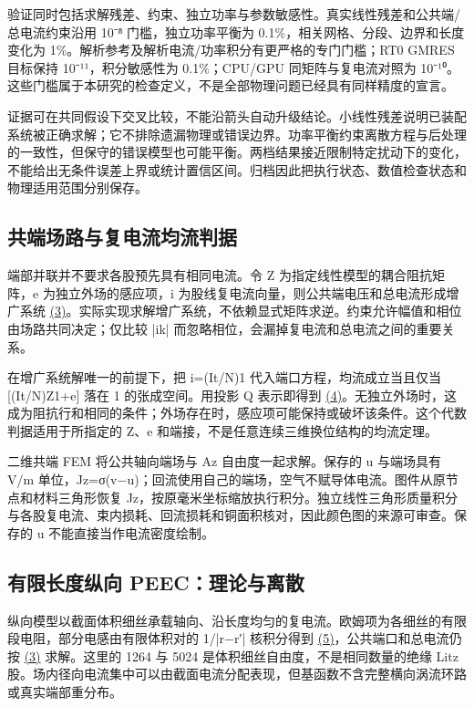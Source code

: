 \documentclass[11pt]{article}
\begin{document}
验证同时包括求解残差、约束、独立功率与参数敏感性。真实线性残差和公共端/总电流约束沿用 10⁻⁸ 门槛，独立功率平衡为 0.1\%，相关网格、分段、边界和长度变化为 1\%。解析参考及解析电流/功率积分有更严格的专门门槛；RT0 GMRES 目标保持 10⁻¹¹，积分敏感性为 0.1\%；CPU/GPU 同矩阵与复电流对照为 10⁻¹⁰。这些门槛属于本研究的检查定义，不是全部物理问题已经具有同样精度的宣言。


证据可在共同假设下交叉比较，不能沿箭头自动升级结论。小线性残差说明已装配系统被正确求解；它不排除遗漏物理或错误边界。功率平衡约束离散方程与后处理的一致性，但保守的错误模型也可能平衡。两档结果接近限制特定扰动下的变化，不能给出无条件误差上界或统计置信区间。归档因此把执行状态、数值检查状态和物理适用范围分别保存。


\subsection*{共端场路与复电流均流判据}
\hypertarget{02.common.heading}{}
端部并联并不要求各股预先具有相同电流。令 Z 为指定线性模型的耦合阻抗矩阵，e 为独立外场的感应项，i 为股线复电流向量，则公共端电压和总电流形成增广系统 \href{paper_zh-CN_single.pdf#E04}{(3)}。实际实现求解增广系统，不依赖显式矩阵求逆。约束允许幅值和相位由场路共同决定；仅比较 |ik| 而忽略相位，会漏掉复电流和总电流之间的重要关系。


在增广系统解唯一的前提下，把 i=(It/N)1 代入端口方程，均流成立当且仅当 [(It/N)Z1+e] 落在 1 的张成空间。用投影 Q 表示即得到 \href{paper_zh-CN_single.pdf#E05}{(4)}。无独立外场时，这成为阻抗行和相同的条件；外场存在时，感应项可能保持或破坏该条件。这个代数判据适用于所指定的 Z、e 和端接，不是任意连续三维换位结构的均流定理。


二维共端 FEM 将公共轴向端场与 Az 自由度一起求解。保存的 u 与端场具有 V/m 单位，Jz=σ(v−u)；回流使用自己的端场，空气不赋导体电流。图件从原节点和材料三角形恢复 Jz，按原毫米坐标缩放执行积分。独立线性三角形质量积分与各股复电流、束内损耗、回流损耗和铜面积核对，因此颜色图的来源可审查。保存的 u 不能直接当作电流密度绘制。


\subsection*{有限长度纵向 PEEC：理论与离散}
\hypertarget{02.peec_method.heading}{}
纵向模型以截面体积细丝承载轴向、沿长度均匀的复电流。欧姆项为各细丝的有限段电阻，部分电感由有限体积对的 1/|r−r′| 核积分得到 \href{paper_zh-CN_single.pdf#E08}{(5)}，公共端口和总电流仍按 \href{paper_zh-CN_single.pdf#E04}{(3)} 求解。这里的 1264 与 5024 是体积细丝自由度，不是相同数量的绝缘 Litz 股。场内径向电流集中可以由截面电流分配表现，但基函数不含完整横向涡流环路或真实端部重分布。
\end{document}
